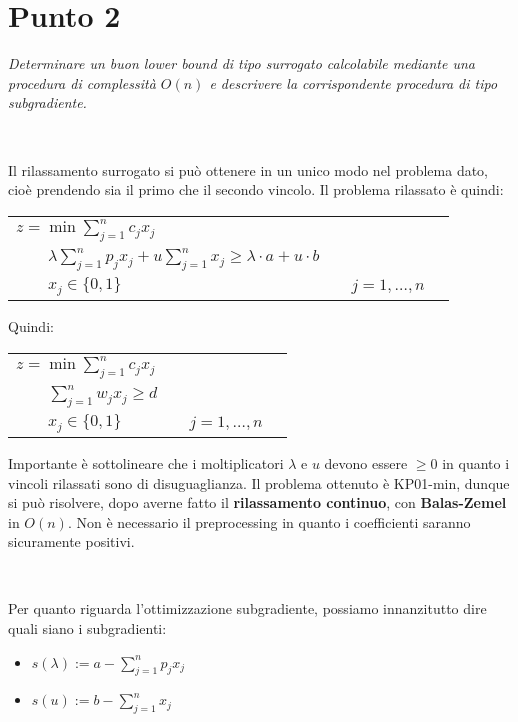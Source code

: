 \documentclass[11pt]{book}
\begin{document}
\section*{Punto 2}

\textit{Determinare un buon lower bound di tipo surrogato calcolabile mediante
una procedura di complessit\`a $O(n)$ e descrivere la corrispondente
procedura di tipo subgradiente.}

\

Il rilassamento surrogato si pu\`o ottenere in un unico modo nel
problema dato, cio\`e prendendo sia il primo che il secondo
vincolo. Il problema rilassato \`e quindi:

\begin{center}
\begin{tabular}{lp{2cm}ll}
$z = \min \sum\limits_{j=1}^n c_jx_j$ & & & \\
$\qquad \lambda\sum\limits_{j = 1}^n p_jx_j + u \sum\limits_{j=1}^n
x_j \geq \lambda \cdot a + u\cdot b$ & & & \\
$\qquad x_j \in\{0,1\}$ & & $j = 1,\dots,n$ & \\
\end{tabular}
\end{center}

Quindi:

\begin{center}
\begin{tabular}{lp{2cm}ll}
$z = \min \sum\limits_{j=1}^n c_jx_j$ & & & \\
$\qquad \sum\limits_{j = 1}^n w_jx_j \geq d$ & & & \\
$\qquad x_j \in\{0,1\}$ & & $j = 1,\dots,n$ & \\
\end{tabular}
\end{center}

Importante \`e sottolineare che i moltiplicatori $\lambda$ e $u$
devono essere $\geq 0$ in quanto i vincoli rilassati sono di
disuguaglianza. Il problema ottenuto \`e KP01-min, dunque si pu\`o
risolvere, dopo averne fatto il \textbf{rilassamento continuo}, con
\textbf{Balas-Zemel} in $O(n)$. Non \`e necessario il preprocessing in
quanto i coefficienti saranno sicuramente positivi.

\

Per quanto riguarda l'ottimizzazione subgradiente, possiamo
innanzitutto dire quali siano i subgradienti:

\begin{itemize}
\item $s(\lambda):=a-\sum\limits_{j=1}^n p_jx_j$
\item $s(u) := b-\sum\limits_{j=1}^n x_j$
\end{itemize}
\end{document}

